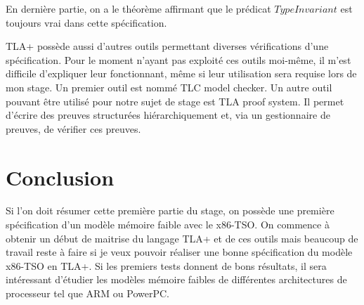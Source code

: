 \documentclass[12pt,a4paper]{article}
\begin{document}
En dernière partie, on a le théorème affirmant que le prédicat $TypeInvariant$ est toujours vrai dans cette spécification.

TLA+ possède aussi d'autres outils permettant diverses vérifications d'une spécification. Pour le moment n'ayant pas exploité ces outils moi-même, il m'est difficile d'expliquer leur fonctionnant, même si leur utilisation sera requise lors de mon stage. Un premier outil est nommé TLC model checker. Un autre outil pouvant être utilisé pour notre sujet de stage est TLA proof system. Il permet d'écrire des preuves structurées hiérarchiquement et, via un gestionnaire de preuves, de vérifier ces preuves.  

\section{Conclusion}

Si l'on doit résumer cette première partie du stage, on possède une première spécification d'un modèle mémoire faible avec le x86-TSO. On commence à obtenir un début de maitrise du langage TLA+ et de ces outils mais beaucoup de travail reste à faire si je veux pouvoir réaliser une bonne spécification du modèle x86-TSO en TLA+. Si les premiers tests donnent de bons résultats, il sera intéressant d'étudier les modèles mémoire faibles de différentes architectures de processeur tel que ARM\cite{Alglave:2009:SPA:1481839.1481842} ou PowerPC.

\clearpage



\end{document}
